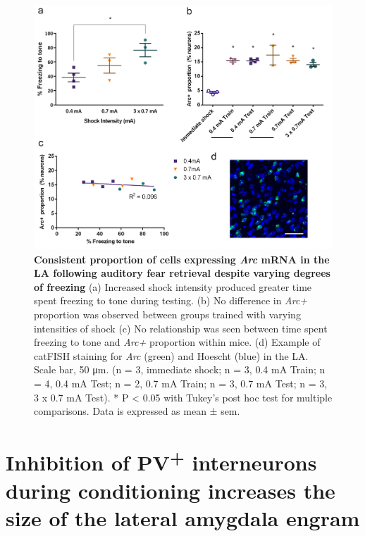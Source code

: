 \documentclass[12pt,a4paper,]{report}
\begin{document}
\begin{figure}[htbp]
\centering
\includegraphics{source/figures/figure_3.jpg}
\caption{\textbf{Consistent proportion of cells expressing \emph{Arc}
mRNA in the LA following auditory fear retrieval despite varying degrees
of freezing} (a) Increased shock intensity produced greater time spent
freezing to tone during testing. (b) No difference in \emph{Arc+}
proportion was observed between groups trained with varying intensities
of shock (c) No relationship was seen between time spent freezing to
tone and \emph{Arc+} proportion within mice. (d) Example of catFISH
staining for \emph{Arc} (green) and Hoescht (blue) in the LA. Scale bar,
50 μm. (n = 3, immediate shock; n = 3, 0.4 mA Train; n = 4, 0.4 mA Test;
n = 2, 0.7 mA Train; n = 3, 0.7 mA Test; n = 3, 3 x 0.7 mA Test). * P
\textless{} 0.05 with Tukey's post hoc test for multiple comparisons.
Data is expressed as mean ± sem. \label{ref_a_figure}}
\end{figure}

\section{\texorpdfstring{Inhibition of PV\textsuperscript{+}
interneurons during conditioning increases the size of the lateral
amygdala
engram}{Inhibition of PV+ interneurons during conditioning increases the size of the lateral amygdala engram}}\label{inhibition-of-pv-interneurons-during-conditioning-increases-the-size-of-the-lateral-amygdala-engram}
\end{document}
